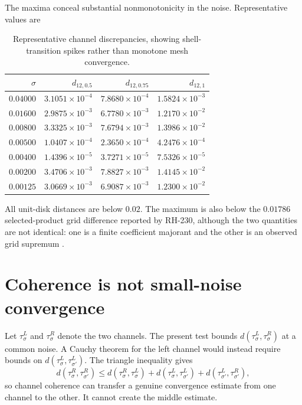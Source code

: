 \documentclass[11pt]{article}
\theoremstyle{remark}
\begin{document}
The maxima conceal substantial nonmonotonicity in the noise.  Representative
values are
\begin{table}[ht]
\centering
\small
\begin{tabular}{rrrr}
\toprule
$\sigma$ & $d_{12,0.5}$ & $d_{12,0.75}$ & $d_{12,1}$\\
\midrule
$0.04000$ & $3.1051\times10^{-4}$ & $7.8680\times10^{-4}$ & $1.5824\times10^{-3}$\\
$0.01600$ & $2.9875\times10^{-3}$ & $6.7780\times10^{-3}$ & $1.2170\times10^{-2}$\\
$0.00800$ & $3.3325\times10^{-3}$ & $7.6794\times10^{-3}$ & $1.3986\times10^{-2}$\\
$0.00500$ & $1.0407\times10^{-4}$ & $2.3650\times10^{-4}$ & $4.2476\times10^{-4}$\\
$0.00400$ & $1.4396\times10^{-5}$ & $3.7271\times10^{-5}$ & $7.5326\times10^{-5}$\\
$0.00200$ & $3.4706\times10^{-3}$ & $7.8827\times10^{-3}$ & $1.4145\times10^{-2}$\\
$0.00125$ & $3.0669\times10^{-3}$ & $6.9087\times10^{-3}$ & $1.2300\times10^{-2}$\\
\bottomrule
\end{tabular}
\caption{Representative channel discrepancies, showing shell-transition
spikes rather than monotone mesh convergence.}
\end{table}

All unit-disk distances are below $0.02$.  The maximum is also below the
$0.01786$ selected-product grid difference reported by RH-230, although the
two quantities are not identical: one is a finite coefficient majorant and
the other is an observed grid supremum \citep{WangRH230}.

\section{Coherence is not small-noise convergence}

Let $\tau^L_\sigma$ and $\tau^R_\sigma$ denote the two channels.  The present
test bounds $d(\tau^L_\sigma,\tau^R_\sigma)$ at a common noise.  A Cauchy
theorem for the left channel would instead require bounds on
$d(\tau^L_\sigma,\tau^L_{\sigma'})$.  The triangle inequality gives
\[
 d(\tau^R_\sigma,\tau^R_{\sigma'})
 \le d(\tau^R_\sigma,\tau^L_\sigma)
    +d(\tau^L_\sigma,\tau^L_{\sigma'})
    +d(\tau^L_{\sigma'},\tau^R_{\sigma'}),
\]
so channel coherence can transfer a genuine convergence estimate from one
channel to the other.  It cannot create the middle estimate.
\end{document}
